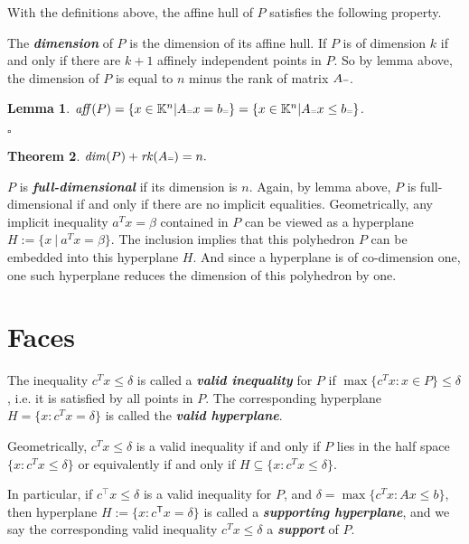 \documentclass{article}
\newcounter{lecnum}
\newcommand{\teq}{{\mbox{\tiny $=$}}}
\newtheorem{theorem}{Theorem}[lecnum]
\newtheorem{lemma}[theorem]{Lemma}
\newenvironment{proof}{{\it Proof.}}{ \hfill $\square$}
\def\K{{\mathbb K}}
\begin{document}
With the definitions above, the affine hull of $P$ satisfies the following property.

The \emph{\textbf{dimension}} of $P$ is the dimension of its affine hull. If $P$ is of dimension $k$ if and only if there are $k+1$ affinely independent points in $P$. So by lemma above, the dimension of $P$ is equal to $n$ minus the rank of matrix $A\teq$.

\begin{lemma}
$\mbox{\emph{aff}}(P)=\{x\in\K^n|A\teq x=b\teq \}=\{x\in\K^n|A\teq x\leq b\teq \}$.
\end{lemma}
\begin{proof}
\end{proof}


\begin{theorem}
$\mbox{\emph{dim}}(P)+\mbox{\emph{rk}}(A\teq)=n.$
\end{theorem}
$P$ is \emph{\textbf{full-dimensional}} if its dimension is $n$. Again, by lemma above, $P$ is full-dimensional if and only if there are no implicit equalities. Geometrically, any implicit inequality $a^T x=\beta$ contained in $P$ can be viewed as a hyperplane $H:=\{x~|~a^T x=\beta\}$. The inclusion implies that this polyhedron $P$ can be embedded into this hyperplane $H$. And since a hyperplane is of co-dimension one, one such hyperplane reduces the dimension of this polyhedron by one.

\section{Faces}

The inequality $c^T x\leqslant \delta$ is called a \emph{\textbf{valid inequality}} for $P$ if $\max\{c^T x: x\in P\}\leqslant \delta$,  i.e. it is satisfied by all points in $P$.  The corresponding hyperplane $H=\{x:c^T x=\delta\}$ is called the \emph{\textbf{valid hyperplane}}.

Geometrically, $c^T x\leqslant \delta$ is a valid inequality if and only if $P$ lies in the half space $\{x:c^T x\leqslant \delta\}$ or equivalently if and only if $H\subseteq \{x:c^Tx\leqslant \delta\}$.

In particular, if $c^\intercal x\leqslant \delta$ is a valid inequality for $P$, and $\delta=\max\{c^T x:Ax\leqslant b\}$, then hyperplane $H:=\{x:c^\mathsf{T} x=\delta\}$ is called a \emph{\textbf{supporting hyperplane}}, and we say the corresponding valid inequality $c^T x\leqslant \delta$ a \emph{\textbf{support}} of $P$.
\end{document}

